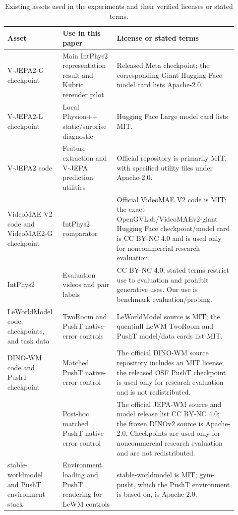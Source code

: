 \begin{table}[htbp]
\centering
\footnotesize
\setlength{\tabcolsep}{3.5pt}
\caption{Existing assets used in the experiments and their verified licenses or stated terms.}
\label{tab:asset-licenses}
\begin{tabular}{@{}>{\raggedright\arraybackslash}p{0.21\linewidth}>{\raggedright\arraybackslash}p{0.22\linewidth}>{\raggedright\arraybackslash}p{0.49\linewidth}@{}}
\toprule
Asset & Use in this paper & License or stated terms \\
\midrule
V-JEPA2-G checkpoint & Main IntPhys2 representation result and Kubric rerender pilot & Released Meta checkpoint; the corresponding Giant Hugging Face model card lists Apache-2.0. \\
V-JEPA2-L checkpoint & Local Physion++ static/surprise diagnostic & Hugging Face Large model card lists MIT. \\
V-JEPA2 code & Feature extraction and V-JEPA prediction utilities & Official repository is primarily MIT, with specified utility files under Apache-2.0. \\
VideoMAE V2 code and VideoMAE2-G checkpoint & IntPhys2 comparator & Official VideoMAE V2 code is MIT; the exact OpenGVLab/VideoMAEv2-giant Hugging Face checkpoint/model card is CC BY-NC 4.0 and is used only for noncommercial research evaluation. \\
IntPhys2 & Evaluation videos and pair labels & CC BY-NC 4.0; stated terms restrict use to evaluation and prohibit generative uses. Our use is benchmark evaluation/probing. \\
LeWorldModel code, checkpoints, and task data & TwoRoom and PushT native-error controls & LeWorldModel source is MIT; the quentinll LeWM TwoRoom and PushT model/data cards list MIT. \\
DINO-WM code and PushT checkpoint & Matched PushT native-error control & The official DINO-WM source repository includes an MIT license; the released OSF PushT checkpoint is used only for research evaluation and is not redistributed. \\
{\leavevmode\color{black}JEPA-WM code and PushT checkpoint} & {\leavevmode\color{black}Post-hoc matched PushT native-error control} & {\leavevmode\color{black}The official JEPA-WM source and model release list CC BY-NC 4.0; the frozen DINOv2 source is Apache-2.0. Checkpoints are used only for noncommercial research evaluation and are not redistributed.} \\
stable-worldmodel and PushT environment stack & Environment loading and PushT rendering for LeWM controls & stable-worldmodel is MIT; gym-pusht, which the PushT environment is based on, is Apache-2.0. \\

\end{tabular}
\end{table}
